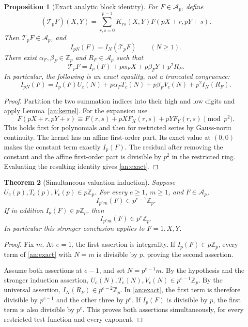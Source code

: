 \documentclass[11pt,a4paper]{article}
\newtheorem{theorem}{Theorem}[section]
\newtheorem{proposition}[theorem]{Proposition}
\theoremstyle{remark}\newtheorem{remark}[theorem]{Remark}
\newcommand{\Z}{\mathbb Z}
\begin{document}
\begin{proposition}[Exact analytic block identity]\label{an:block}
For \(F\in\mathcal A_p\), define
\[
 (\mathcal T_pF)(X,Y)=
 \sum_{r,s=0}^{p-1}K_{rs}(X,Y)F(pX+r,pY+s).
\]
Then \(\mathcal T_pF\in\mathcal A_p\), and
\[
 I_{pN}(F)=I_N(\mathcal T_pF)\qquad(N\ge1).
\]
There exist \(\alpha_F,\beta_F\in\Z_p\) and \(R_F\in\mathcal A_p\) such that
\begin{equation}\label{an:operator}
 \mathcal T_pF=I_p(F)+p\alpha_FX+p\beta_FY+p^2R_F.
\end{equation}
In particular, the following is an exact equality, not a truncated
congruence:
\begin{equation}\label{an:exact}
 I_{pN}(F)=I_p(F)U_c(N)+p\alpha_FT_c(N)+p\beta_FV_c(N)
                         +p^2I_N(R_F).
\end{equation}
\end{proposition}
\begin{proof}
Partition the two summation indices into their high and low digits and
apply Lemma~\ref{an:kernel}. For the expansion use
\[
 F(pX+r,pY+s)\equiv
 F(r,s)+pXF_X(r,s)+pYF_Y(r,s)\pmod{p^2}.
\]
This holds first for polynomials and then for restricted series by
Gauss-norm continuity. The kernel has an affine first-order part.
Its exact value at \((0,0)\) makes the constant term exactly \(I_p(F)\).
The residual after removing the constant and the affine first-order
part is divisible by \(p^2\) in the restricted ring. Evaluating the
resulting identity gives \eqref{an:exact}.
\end{proof}

\begin{theorem}[Simultaneous valuation induction]\label{an:moment}
Suppose \(U_c(p),T_c(p),V_c(p)\in p\Z_p\). For every \(e\ge1\), \(m\ge1\),
and \(F\in\mathcal A_p\),
\[
 I_{p^em}(F)\in p^{e-1}\Z_p.
\]
If in addition \(I_p(F)\in p\Z_p\), then
\[
 I_{p^em}(F)\in p^e\Z_p.
\]
In particular this stronger conclusion applies to \(F=1,X,Y\).
\end{theorem}
\begin{proof}
Fix \(m\). At \(e=1\), the first assertion is integrality. If
\(I_p(F)\in p\Z_p\), every term of \eqref{an:exact} with \(N=m\)
is divisible by \(p\), proving the second assertion.

Assume both assertions at \(e-1\), and set \(N=p^{e-1}m\).
By the hypothesis and the stronger induction assertion,
\(U_c(N),T_c(N),V_c(N)\in p^{e-1}\Z_p\). By the universal assertion,
\(I_N(R_F)\in p^{e-2}\Z_p\). In \eqref{an:exact}, the first term
is therefore divisible by \(p^{e-1}\) and the other three by \(p^e\).
If \(I_p(F)\) is divisible by \(p\), the first term is also divisible
by \(p^e\). This proves both assertions simultaneously, for every
restricted test function and every exponent.
\end{proof}
\end{document}
